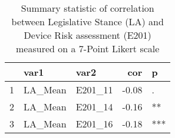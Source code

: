 \begin{table}[ht]
\centering
\begin{tabular}{rllrl}
  \hline
 & var1 & var2 & cor & p \\ 
  \hline
1 & LA\_Mean & E201\_11 & -0.08 & . \\ 
  2 & LA\_Mean & E201\_14 & -0.16 & ** \\ 
  3 & LA\_Mean & E201\_16 & -0.18 & *** \\ 
   \hline
\end{tabular}
\caption{Summary statistic of correlation between Legislative Stance (LA) and Device Risk assessment (E201) measured on a 7-Point Likert scale} 
\end{table}
